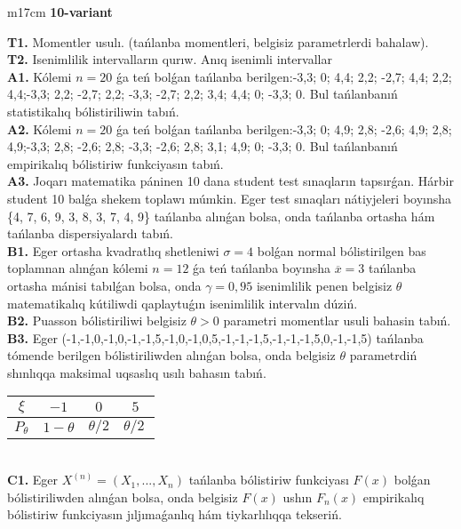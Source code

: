 \documentclass{article}
\begin{document}
\begin{tabular}{m{17cm}}
\textbf{10-variant}
\newline

\textbf{T1.} 
Momentler usulı. (tańlanba momentleri, belgisiz parametrlerdi bahalaw).
 \\
\textbf{T2.} 
Isenimlilik intervalların qurıw. Anıq isenimli intervallar
 \\
\textbf{A1.} 
Kólemi \(n = 20\) ǵa teń bolǵan tańlanba berilgen:-3,3; 0; 4,4; 2,2; -2,7; 4,4; 2,2; 4,4;-3,3; 2,2; -2,7; 2,2; -3,3; -2,7; 2,2; 3,4; 4,4; 0; -3,3; 0. Bul tańlanbanıń statistikalıq bólistiriliwin tabıń.
 \\
\textbf{A2.} 
Kólemi \(n = 20\) ǵa teń bolǵan tańlanba berilgen:-3,3; 0; 4,9; 2,8; -2,6; 4,9; 2,8; 4,9;-3,3; 2,8; -2,6; 2,8; -3,3; -2,6; 2,8; 3,1; 4,9; 0; -3,3; 0. Bul tańlanbanıń empirikalıq bólistiriw funkciyasın tabıń.
 \\
\textbf{A3.} 
Joqarı matematika páninen 10 dana student test sınaqların tapsırǵan. Hárbir student 10 balǵa shekem toplawı múmkin. Eger test sınaqları nátiyjeleri boyınsha \{4, 7, 6, 9, 3, 8, 3, 7, 4, 9\} tańlanba alınǵan bolsa, onda tańlanba ortasha hám tańlanba dispersiyalardı tabıń.
 \\
\textbf{B1.} 
Eger ortasha kvadratlıq shetleniwi \(\sigma = 4\) bolǵan normal bólistirilgen bas toplamnan alınǵan kólemi \(n = 12\) ǵa teń tańlanba boyınsha \(\overline{x} = 3\) tańlanba ortasha mánisi tabılǵan bolsa, onda \(\gamma = 0,95\) isenimlilik penen belgisiz \(\theta\) matematikalıq kútiliwdi qaplaytuǵın isenimlilik intervalın dúziń.
 \\
\textbf{B2.} 
Puasson bólistiriliwi belgisiz \(\theta > 0\) parametri momentlar usuli bahasin tabıń.
 \\
\textbf{B3.} 
Eger (-1,-1,0,-1,0,-1,-1,5,-1,0,-1,0,5,-1,-1,-1,5,-1,-1,-1,5,0,-1,-1,5) tańlanba tómende berilgen bólistiriliwden alınǵan bolsa, onda belgisiz \(\theta\) parametrdiń shınlıqqa maksimal uqsaslıq usılı bahasın tabıń.
\begin{tabular}{|c|c|c|c|}
  \hline
$\xi$
&
$- 1$
&
$0$
&
$5$\\
\hline
\(P_{\theta}\) & \(1 - \theta\) & \(\theta/2\) & \(\theta/2\ \) \\
\hline
\end{tabular}
 \\
\textbf{C1.} 
Eger \(X^{(n)} = \left( X_{1},...,X_{n} \right)\) tańlanba bólistiriw funkciyası \(F(x)\) bolǵan bólistiriliwden alınǵan bolsa, onda belgisiz \(F(x)\) ushın \(F_{n}(x)\) empirikalıq bólistiriw funkciyasın jıljımaǵanlıq hám tiykarlılıqqa tekseriń.

\end{tabular}
\end{document}
